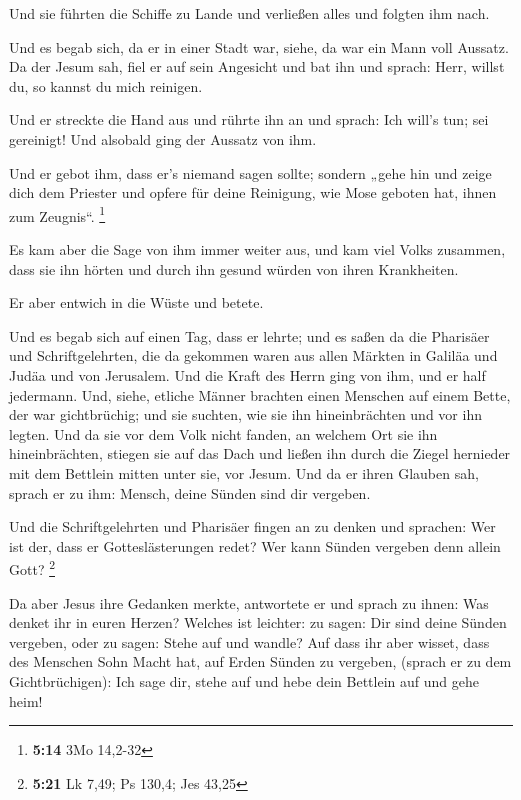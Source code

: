  Und sie führten die Schiffe zu Lande und verließen alles
und folgten ihm nach.

 Und es begab sich, da er in einer Stadt war, siehe, da war
ein Mann voll Aussatz. Da der Jesum sah, fiel er auf sein Angesicht und
bat ihn und sprach: Herr, willst du, so kannst du mich reinigen.

 Und er streckte die Hand aus und rührte ihn an und sprach:
Ich will's tun; sei gereinigt! Und alsobald ging der Aussatz von ihm.

 Und er gebot ihm, dass er's niemand sagen sollte; sondern
„gehe hin und zeige dich dem Priester und opfere für deine Reinigung,
wie Mose geboten hat, ihnen zum Zeugnis``. \footnote{\textbf{5:14} 3Mo
  14,2-32}

 Es kam aber die Sage von ihm immer weiter aus, und kam
viel Volks zusammen, dass sie ihn hörten und durch ihn gesund würden von
ihren Krankheiten.

 Er aber entwich in die Wüste und betete.

 Und es begab sich auf einen Tag, dass er lehrte; und es
saßen da die Pharisäer und Schriftgelehrten, die da gekommen waren aus
allen Märkten in Galiläa und Judäa und von Jerusalem. Und die Kraft des
Herrn ging von ihm, und er half jedermann.  Und, siehe,
etliche Männer brachten einen Menschen auf einem Bette, der war
gichtbrüchig; und sie suchten, wie sie ihn hineinbrächten und vor ihn
legten.  Und da sie vor dem Volk nicht fanden, an welchem
Ort sie ihn hineinbrächten, stiegen sie auf das Dach und ließen ihn
durch die Ziegel hernieder mit dem Bettlein mitten unter sie, vor Jesum.
 Und da er ihren Glauben sah, sprach er zu ihm: Mensch,
deine Sünden sind dir vergeben.

 Und die Schriftgelehrten und Pharisäer fingen an zu denken
und sprachen: Wer ist der, dass er Gotteslästerungen redet? Wer kann
Sünden vergeben denn allein Gott? \footnote{\textbf{5:21} Lk 7,49; Ps
  130,4; Jes 43,25}

 Da aber Jesus ihre Gedanken merkte, antwortete er und
sprach zu ihnen: Was denket ihr in euren Herzen?  Welches
ist leichter: zu sagen: Dir sind deine Sünden vergeben, oder zu sagen:
Stehe auf und wandle?  Auf dass ihr aber wisset, dass des
Menschen Sohn Macht hat, auf Erden Sünden zu vergeben, (sprach er zu dem
Gichtbrüchigen): Ich sage dir, stehe auf und hebe dein Bettlein auf und
gehe heim!

